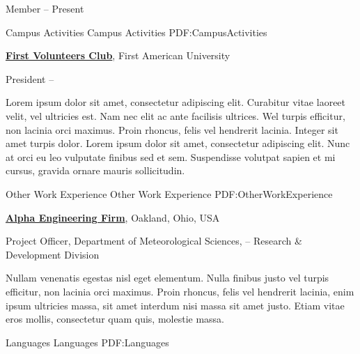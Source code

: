 \documentclass[letterpaper,MMMyyyy,nonstopmode]{simpleresumecv}
\begin{document}
\begin{Body}
\Gap
\BulletItem
Member
\hfill
{} --
Present



\Section
{Campus Activities}
{Campus Activities}
{PDF:CampusActivities}

\Entry
\href{http://www.example.com/my-club}
{\textbf{First Volunteers Club}},
First American University

\Gap
\BulletItem
President
\hfill
{} --
\begin{Detail}
\SubBulletItem
Lorem ipsum dolor sit amet, consectetur adipiscing elit.
\SubBulletItem
Curabitur vitae laoreet velit, vel ultricies est. Nam nec elit ac ante facilisis ultrices.
\SubSubBulletItem
Wel turpis efficitur, non lacinia orci maximus.
\SubSubBulletItem
Proin rhoncus, felis vel hendrerit lacinia.
\SubBulletItem
Integer sit amet turpis dolor. Lorem ipsum dolor sit amet, consectetur adipiscing elit. Nunc at orci eu leo vulputate finibus sed et sem.
\SubBulletItem
Suspendisse volutpat sapien et mi cursus, gravida ornare mauris sollicitudin.
\end{Detail}


\Section
{Other Work\newline
Experience}
{Other Work Experience}
{PDF:OtherWorkExperience}

\Entry
\href{http://www.example.com/my-company}
{\textbf{Alpha Engineering Firm}},
Oakland, Ohio, USA

\Gap
\BulletItem
Project Officer,
Department of Meteorological Sciences,
\hfill
{} --
\newline
Research \& Development Division
\begin{Detail}
\SubBulletItem
Nullam venenatis egestas nisl eget elementum.
\SubBulletItem
Nulla finibus justo vel turpis efficitur, non lacinia orci maximus. Proin rhoncus, felis vel hendrerit lacinia, enim ipsum ultricies massa, sit amet interdum nisi massa sit amet justo.
\SubBulletItem
Etiam vitae eros mollis, consectetur quam quis, molestie massa.
\end{Detail}


\Section
{Languages}
{Languages}
{PDF:Languages}


\end{Body}
\end{document}
